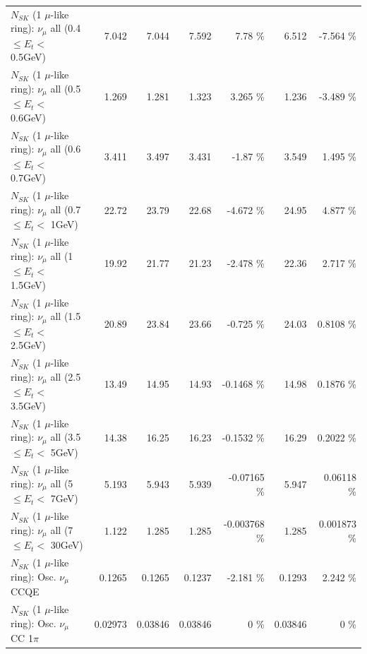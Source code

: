 \begin{table}
\begin{tabular}{| l | r | r | r  r | r  r |}
       $N_{SK}$ (1 $\mu$-like ring): $\nu_{\mu}$ all (0.4 $\leq E_{t} <$ 0.5GeV) &           7.042 &           7.044 &           7.592 &     7.78 \%  &           6.512 &   -7.564 \%  \\ 
       $N_{SK}$ (1 $\mu$-like ring): $\nu_{\mu}$ all (0.5 $\leq E_{t} <$ 0.6GeV) &           1.269 &           1.281 &           1.323 &    3.265 \%  &           1.236 &   -3.489 \%  \\ 
       $N_{SK}$ (1 $\mu$-like ring): $\nu_{\mu}$ all (0.6 $\leq E_{t} <$ 0.7GeV) &           3.411 &           3.497 &           3.431 &    -1.87 \%  &           3.549 &    1.495 \%  \\ 
         $N_{SK}$ (1 $\mu$-like ring): $\nu_{\mu}$ all (0.7 $\leq E_{t} <$ 1GeV) &           22.72 &           23.79 &           22.68 &   -4.672 \%  &           24.95 &    4.877 \%  \\ 
         $N_{SK}$ (1 $\mu$-like ring): $\nu_{\mu}$ all (1 $\leq E_{t} <$ 1.5GeV) &           19.92 &           21.77 &           21.23 &   -2.478 \%  &           22.36 &    2.717 \%  \\ 
       $N_{SK}$ (1 $\mu$-like ring): $\nu_{\mu}$ all (1.5 $\leq E_{t} <$ 2.5GeV) &           20.89 &           23.84 &           23.66 &   -0.725 \%  &           24.03 &   0.8108 \%  \\ 
       $N_{SK}$ (1 $\mu$-like ring): $\nu_{\mu}$ all (2.5 $\leq E_{t} <$ 3.5GeV) &           13.49 &           14.95 &           14.93 &  -0.1468 \%  &           14.98 &   0.1876 \%  \\ 
         $N_{SK}$ (1 $\mu$-like ring): $\nu_{\mu}$ all (3.5 $\leq E_{t} <$ 5GeV) &           14.38 &           16.25 &           16.23 &  -0.1532 \%  &           16.29 &   0.2022 \%  \\ 
           $N_{SK}$ (1 $\mu$-like ring): $\nu_{\mu}$ all (5 $\leq E_{t} <$ 7GeV) &           5.193 &           5.943 &           5.939 & -0.07165 \%  &           5.947 &  0.06118 \%  \\ 
          $N_{SK}$ (1 $\mu$-like ring): $\nu_{\mu}$ all (7 $\leq E_{t} <$ 30GeV) &           1.122 &           1.285 &           1.285 & -0.003768 \%  &           1.285 & 0.001873 \%  \\ 
\hline
\hline
                               $N_{SK}$ (1 $\mu$-like ring): Osc. $\nu_\mu$ CCQE &          0.1265 &          0.1265 &          0.1237 &   -2.181 \%  &          0.1293 &    2.242 \%  \\ 
                          $N_{SK}$ (1 $\mu$-like ring): Osc. $\nu_\mu$ CC 1$\pi$ &         0.02973 &         0.03846 &         0.03846 &        0 \%  &         0.03846 &        0 \%  \\ 

\end{tabular}
\end{table}
